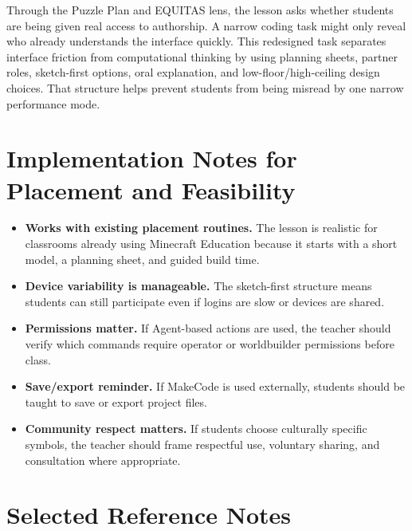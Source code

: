 \documentclass[11pt]{article}
\begin{document}
Through the Puzzle Plan and EQUITAS lens, the lesson asks whether students are being given real access to authorship. A narrow coding task might only reveal who already understands the interface quickly. This redesigned task separates interface friction from computational thinking by using planning sheets, partner roles, sketch-first options, oral explanation, and low-floor/high-ceiling design choices. That structure helps prevent students from being misread by one narrow performance mode.

\section*{Implementation Notes for Placement and Feasibility}

\begin{itemize}[leftmargin=*]
    \item \textbf{Works with existing placement routines.} The lesson is realistic for classrooms already using Minecraft Education because it starts with a short model, a planning sheet, and guided build time.
    \item \textbf{Device variability is manageable.} The sketch-first structure means students can still participate even if logins are slow or devices are shared.
    \item \textbf{Permissions matter.} If Agent-based actions are used, the teacher should verify which commands require operator or worldbuilder permissions before class.
    \item \textbf{Save/export reminder.} If MakeCode is used externally, students should be taught to save or export project files.
    \item \textbf{Community respect matters.} If students choose culturally specific symbols, the teacher should frame respectful use, voluntary sharing, and consultation where appropriate.
\end{itemize}

\section*{Selected Reference Notes}
\end{document}
